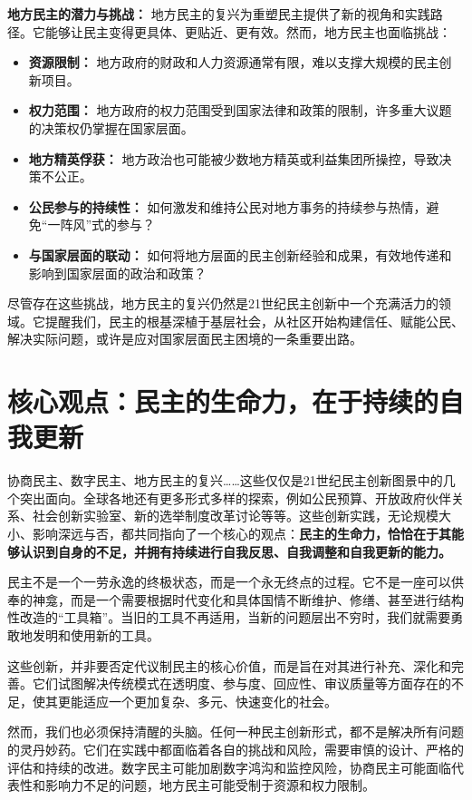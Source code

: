 \documentclass[UTF8, 10pt]{ctexbook}
\begin{document}
\textbf{地方民主的潜力与挑战：}
地方民主的复兴为重塑民主提供了新的视角和实践路径。它能够让民主变得更具体、更贴近、更有效。然而，地方民主也面临挑战：
\begin{itemize}
    \item \textbf{资源限制：} 地方政府的财政和人力资源通常有限，难以支撑大规模的民主创新项目。
    \item \textbf{权力范围：} 地方政府的权力范围受到国家法律和政策的限制，许多重大议题的决策权仍掌握在国家层面。
    \item \textbf{地方精英俘获：} 地方政治也可能被少数地方精英或利益集团所操控，导致决策不公正。
    \item \textbf{公民参与的持续性：} 如何激发和维持公民对地方事务的持续参与热情，避免“一阵风”式的参与？
    \item \textbf{与国家层面的联动：} 如何将地方层面的民主创新经验和成果，有效地传递和影响到国家层面的政治和政策？
\end{itemize}
尽管存在这些挑战，地方民主的复兴仍然是21世纪民主创新中一个充满活力的领域。它提醒我们，民主的根基深植于基层社会，从社区开始构建信任、赋能公民、解决实际问题，或许是应对国家层面民主困境的一条重要出路。

\section{核心观点：民主的生命力，在于持续的自我更新}
\lettrine[lines=2]{协}{商}民主、数字民主、地方民主的复兴……这些仅仅是21世纪民主创新图景中的几个突出面向。全球各地还有更多形式多样的探索，例如公民预算、开放政府伙伴关系、社会创新实验室、新的选举制度改革讨论等等。这些创新实践，无论规模大小、影响深远与否，都共同指向了一个核心的观点：\textbf{民主的生命力，恰恰在于其能够认识到自身的不足，并拥有持续进行自我反思、自我调整和自我更新的能力。}

民主不是一个一劳永逸的终极状态，而是一个永无终点的过程。它不是一座可以供奉的神龛，而是一个需要根据时代变化和具体国情不断维护、修缮、甚至进行结构性改造的“工具箱”。当旧的工具不再适用，当新的问题层出不穷时，我们就需要勇敢地发明和使用新的工具。

这些创新，并非要否定代议制民主的核心价值，而是旨在对其进行补充、深化和完善。它们试图解决传统模式在透明度、参与度、回应性、审议质量等方面存在的不足，使其更能适应一个更加复杂、多元、快速变化的社会。

然而，我们也必须保持清醒的头脑。任何一种民主创新形式，都不是解决所有问题的灵丹妙药。它们在实践中都面临着各自的挑战和风险，需要审慎的设计、严格的评估和持续的改进。数字民主可能加剧数字鸿沟和监控风险，协商民主可能面临代表性和影响力不足的问题，地方民主可能受制于资源和权力限制。
\end{document}
